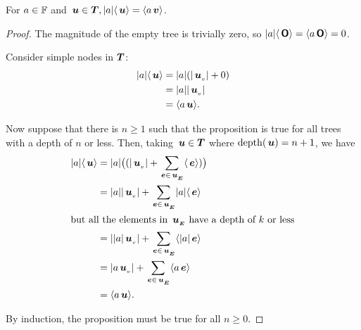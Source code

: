 \begin{proposition}\label{absolutehomogeneity}
  For \(a \in \FIELD\) and \(\node{u} \in \DOM, \abs{a}\nabs{\node{u}} =
  \nabs{a \node{v}}\).
\begin{proof}
  The magnitude of the empty tree is trivially zero, so \(\abs{a}\nabs{\zerotree} =
  \nabs{a\zerotree} = 0\).

  Consider simple nodes in $\DOM$:
  \begin{align*}
      \abs{a}\nabs{\node{u}} &= \abs{a}(\abs{\nv{u}} + 0) \\
      &= \abs{a}\abs{\nv{u}} \\
      &= \nabs{a \node{u}}.
  \end{align*}

  Now suppose that there is \(n \ge 1\) such that the proposition is true for
  all trees with a depth of \(n\) or less. Then, taking \(\node{u} \in
  \DOM\) where \(\depth(\node{u}) = n+1\), we have
  \begin{align*}
      \abs{a}\nabs{\node{u}} &= \abs{a}\bigl((\abs{\nv{u}} + \sum_{\node{e}\in\extn{u}}\nabs{\node{e}})\bigr) \\
      &= \abs{a}\abs{\nv{u}} + \sum_{\node{e}\in\extn{u}}\abs{a}\nabs{\node{e}}\\
      \intertext{but all the elements in \(\extn{u}\) have a depth of \(k\) or less}
      &= \abs{\abs{a}\nv{u}} + \sum_{\node{e}\in\extn{u}}\nabs{\abs{a}\node{e}} \\
      &= \abs{a\nv{u}} + \sum_{\node{e}\in\extn{u}}\nabs{a \node{e}} \\
      &= \nabs{a \node{u}}.
  \end{align*}

  By induction, the proposition must be true for all \(n \geq 0\).
\end{proof}
\end{proposition}



